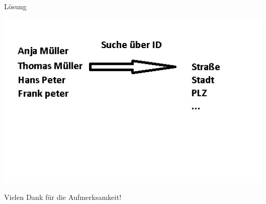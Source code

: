 \documentclass[xcolor={usenames,dvipsnames}, compress, 10pt]{beamer}
\begin{document}
\begin{frame}{Lösung}
\begin{center}


\includegraphics[width=\textheight]{Bilder/presi2.jpg} 

\end{center}
\end{frame}




\begin{frame}
\begin{center}
Vielen Dank f\"ur die Aufmerksamkeit!
\end{center}
\end{frame}
\end{document}
